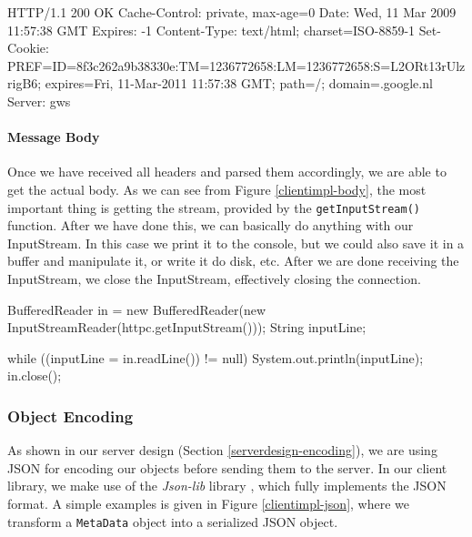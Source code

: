 \begin{figure*}[ht] %
\begin{center}
\begin{code}
HTTP/1.1 200 OK
Cache-Control: private, max-age=0
Date: Wed, 11 Mar 2009 11:57:38 GMT
Expires: -1
Content-Type: text/html; charset=ISO-8859-1
Set-Cookie: 
  PREF=ID=8f3c262a9b38330e:TM=1236772658:LM=1236772658:S=L2ORt13rUlzrigB6; 
  expires=Fri, 11-Mar-2011 11:57:38 GMT; path=/; domain=.google.nl
Server: gws
\end{code}
\caption{An HTTP response including cookies.\label{clientimpl-cookies-resp}}
\end{center}
\end{figure*}

\paragraph{Message Body}
Once we have received all headers and parsed them accordingly, we are able to
get the actual body. As we can see from Figure \ref{clientimpl-body}, the most
important thing is getting the stream, provided by the \texttt{getInputStream()}
function. After we have done this, we can basically do anything with our
InputStream. In this case we print it to the console, but we could also save it
in a buffer and manipulate it, or write it do disk, etc. After we are done
receiving the InputStream, we close the InputStream, effectively closing the
connection.

\begin{figure*}[ht] %
\begin{center}
\begin{code}
BufferedReader in = 
  new BufferedReader(new InputStreamReader(httpc.getInputStream()));
String inputLine;

while ((inputLine = in.readLine()) != null) {
    System.out.println(inputLine);
}
in.close();
\end{code}
\caption{Retrieving the HTTP response's body.\label{clientimpl-body}}
\end{center}
\end{figure*}

\subsubsection{Object Encoding}
\label{clientimpl-encoding}
As shown in our server design (Section \ref{serverdesign-encoding}), we are using
JSON for encoding our objects before sending them to the server. In our client
library, we make use of the \emph{Json-lib} library \cite{json-lib-www}, which
fully implements the JSON format. A simple examples is given in Figure
\ref{clientimpl-json}, where we transform a \texttt{MetaData} object into a
serialized JSON object.

